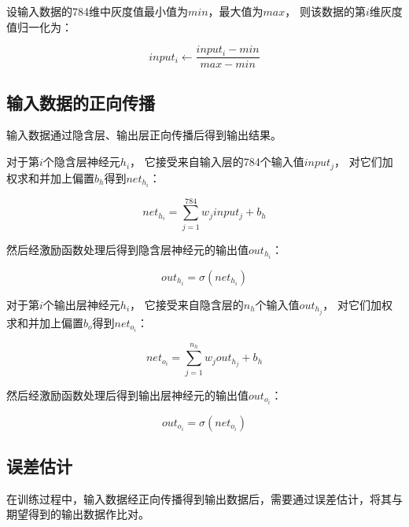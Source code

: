 \documentclass[forprint]{WHUBachelor}
\begin{document}
         设输入数据的784维中灰度值最小值为$min$，最大值为$max$，
         则该数据的第$i$维灰度值归一化为：
   
         \begin{equation}
           input_{i}\gets \frac{input_{i}-min}{max-min}
         \end{equation}
   
       \subsection{输入数据的正向传播}
   
         输入数据通过隐含层、输出层正向传播后得到输出结果。
   
         对于第$i$个隐含层神经元$h_i$，
         它接受来自输入层的784个输入值$input_j$，
         对它们加权求和并加上偏置$b_h$得到$net_{h_i}$：
   
         \begin{equation}
           net_{h_i}=\sum_{j=1}^{784}{w_jinput_j}+b_h
         \end{equation}
   
         然后经激励函数处理后得到隐含层神经元的输出值$out_{h_i}$：
   
         \begin{equation}
           out_{h_i}=\sigma(net_{h_i})
         \end{equation}
   
         对于第$i$个输出层神经元$h_i$，
         它接受来自隐含层的$n_h$个输入值$out_{h_j}$，
         对它们加权求和并加上偏置$b_o$得到$net_{o_i}$：
   
         \begin{equation}
           net_{o_i}=\sum_{j=1}^{n_h}{w_jout_{h_j}}+b_h
         \end{equation}
   
         然后经激励函数处理后得到输出层神经元的输出值$out_{o_i}$：
   
         \begin{equation}
           out_{o_i}=\sigma(net_{o_i})
         \end{equation}
   
       \subsection{误差估计}
       
       在训练过程中，输入数据经正向传播得到输出数据后，需要通过误差估计，将其与期望得到的输出数据作比对。
   
\end{document}
